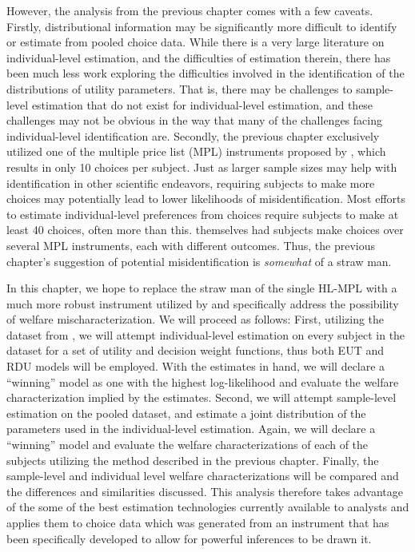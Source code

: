 \documentclass[../main.tex]{subfiles}
\begin{document}
However, the analysis from the previous chapter comes with a few caveats.
Firstly, distributional information may be significantly more difficult to identify or estimate from pooled choice data.
While there is a very large literature on individual-level estimation,{\footnotemark} and the difficulties of estimation therein, there has been much less work exploring the difficulties involved in the identification of the distributions of utility parameters.{\footnotemark}
That is, there may be challenges to sample-level estimation that do not exist for individual-level estimation, and these challenges may not be obvious in the way that many of the challenges facing individual-level identification are.
Secondly, the previous chapter exclusively utilized one of the multiple price list (MPL) instruments proposed by \textcite{Holt2002}, which results in only 10 choices per subject.
Just as larger sample sizes may help with identification in other scientific endeavors, requiring subjects to make more choices may potentially lead to lower likelihoods of misidentification.
Most efforts to estimate individual-level preferences from choices require subjects to make at least 40 choices, often more than this.
\textcite{Holt2002} themselves had subjects make choices over several MPL instruments, each with different outcomes.
Thus, the previous chapter's suggestion of potential misidentification is \textit{somewhat} of a straw man.

\addtocounter{footnote}{-1}

In this chapter, we hope to replace the straw man of the single HL-MPL with a much more robust instrument utilized by \textcite{Harrison2015} and specifically address the possibility of welfare mischaracterization.
We will proceed as follows:
First, utilizing the dataset from \textcite{Harrison2015}, we will attempt individual-level estimation on every subject in the dataset for a set of utility and decision weight functions, thus both EUT and RDU models will be employed.
With the estimates in hand, we will declare a \enquote{winning} model as one with the highest log-likelihood{\footnotemark} and evaluate the welfare characterization implied by the estimates.
Second, we will attempt sample-level estimation on the pooled dataset, and estimate a joint distribution of the parameters used in the individual-level estimation.
Again, we will declare a \enquote{winning} model and evaluate the welfare characterizations of each of the subjects utilizing the method described in the previous chapter.
Finally, the sample-level and individual level welfare characterizations will be compared and the differences and similarities discussed.
This analysis therefore takes advantage of the some of the best estimation technologies currently available to analysts and applies them to choice data which was generated from an instrument that has been specifically developed to allow for powerful inferences to be drawn it.
\end{document}
